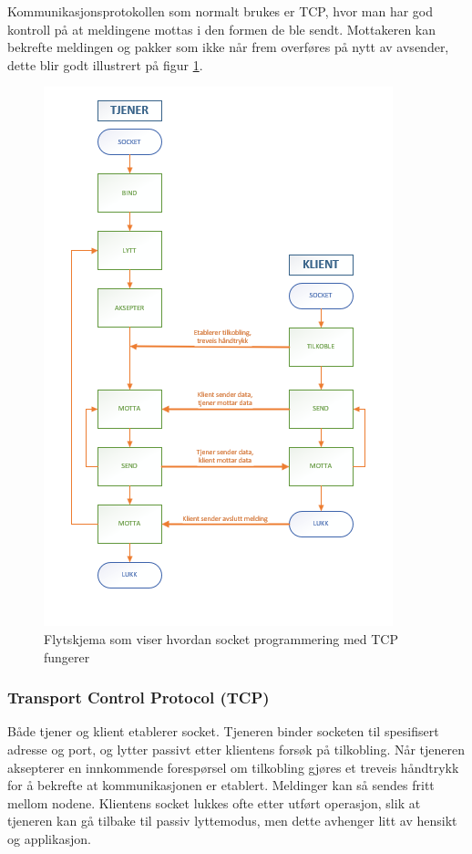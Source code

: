 \documentclass[conference]{IEEEtran}
\begin{document}
        Kommunikasjonsprotokollen som normalt brukes er TCP, hvor man har god kontroll på at meldingene mottas i den formen de ble sendt. Mottakeren 
        kan bekrefte meldingen og pakker som ikke når frem overføres på nytt av avsender, dette blir godt illustrert på figur \ref{fig:socket}.
        \begin{figure}
            \centering
            \includegraphics[width=.8\linewidth]{images/socket_flytskjema.png}
            \caption{Flytskjema som viser hvordan socket programmering med TCP fungerer}
            \label{fig:socket}
        \end{figure}
        \subsubsection{Transport Control Protocol (TCP)}
            Både tjener og klient etablerer socket. Tjeneren binder socketen til spesifisert adresse og port, og lytter passivt etter klientens 
            forsøk på tilkobling. Når tjeneren aksepterer en innkommende forespørsel om tilkobling gjøres et treveis håndtrykk for å bekrefte at 
            kommunikasjonen er etablert. Meldinger kan så sendes fritt mellom nodene. Klientens socket lukkes ofte etter utført operasjon, slik at 
            tjeneren kan gå tilbake til passiv lyttemodus, men dette avhenger litt av hensikt og applikasjon.
    
\end{document}
